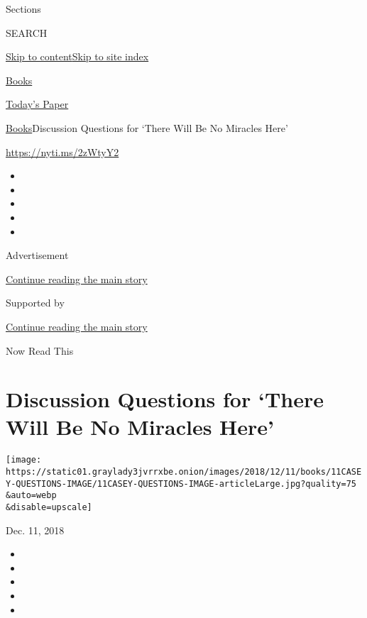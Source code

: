 Sections

SEARCH

\protect\hyperlink{site-content}{Skip to
content}\protect\hyperlink{site-index}{Skip to site index}

\href{https://www.nytimes3xbfgragh.onion/section/books}{Books}

\href{https://myaccount.nytimes3xbfgragh.onion/auth/login?response_type=cookie\&client_id=vi}{}

\href{https://www.nytimes3xbfgragh.onion/section/todayspaper}{Today's
Paper}

\href{/section/books}{Books}\textbar{}Discussion Questions for `There
Will Be No Miracles Here'

\url{https://nyti.ms/2zWtyY2}

\begin{itemize}
\item
\item
\item
\item
\item
\end{itemize}

Advertisement

\protect\hyperlink{after-top}{Continue reading the main story}

Supported by

\protect\hyperlink{after-sponsor}{Continue reading the main story}

Now Read This

\hypertarget{discussion-questions-for-there-will-be-no-miracles-here}{%
\section{Discussion Questions for `There Will Be No Miracles
Here'}\label{discussion-questions-for-there-will-be-no-miracles-here}}

\texttt{[image: https://static01.graylady3jvrrxbe.onion/images/2018/12/11/books/11CASEY-QUESTIONS-IMAGE/11CASEY-QUESTIONS-IMAGE-articleLarge.jpg?quality=75\\\&auto=webp\\\&disable=upscale]}

Dec. 11, 2018

\begin{itemize}
\item
\item
\item
\item
\item
\end{itemize}

